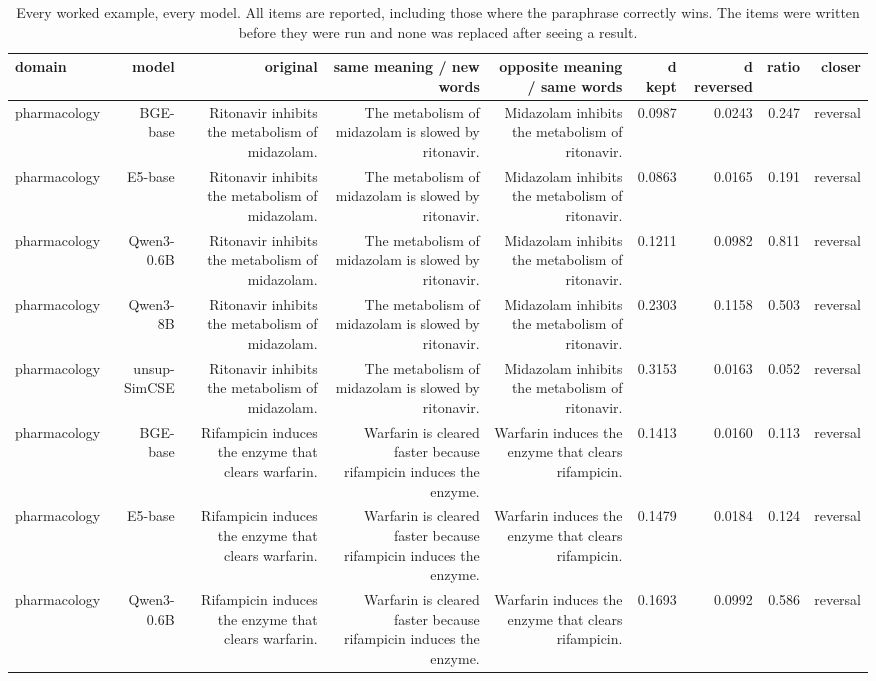 \begin{table}[t]
\centering
\small
\caption{Every worked example, every model. All items are reported, including those where the paraphrase correctly wins. The items were written before they were run and none was replaced after seeing a result.}
\begin{tabular}{lrrrrrrrr}
\toprule
domain & model & original & same meaning / new words & opposite meaning / same words & d kept & d reversed & ratio & closer \\
\midrule
pharmacology & BGE-base & Ritonavir inhibits the metabolism of midazolam. & The metabolism of midazolam is slowed by ritonavir. & Midazolam inhibits the metabolism of ritonavir. & 0.0987 & 0.0243 & 0.247 & reversal \\
pharmacology & E5-base & Ritonavir inhibits the metabolism of midazolam. & The metabolism of midazolam is slowed by ritonavir. & Midazolam inhibits the metabolism of ritonavir. & 0.0863 & 0.0165 & 0.191 & reversal \\
pharmacology & Qwen3-0.6B & Ritonavir inhibits the metabolism of midazolam. & The metabolism of midazolam is slowed by ritonavir. & Midazolam inhibits the metabolism of ritonavir. & 0.1211 & 0.0982 & 0.811 & reversal \\
pharmacology & Qwen3-8B & Ritonavir inhibits the metabolism of midazolam. & The metabolism of midazolam is slowed by ritonavir. & Midazolam inhibits the metabolism of ritonavir. & 0.2303 & 0.1158 & 0.503 & reversal \\
pharmacology & unsup-SimCSE & Ritonavir inhibits the metabolism of midazolam. & The metabolism of midazolam is slowed by ritonavir. & Midazolam inhibits the metabolism of ritonavir. & 0.3153 & 0.0163 & 0.052 & reversal \\
pharmacology & BGE-base & Rifampicin induces the enzyme that clears warfarin. & Warfarin is cleared faster because rifampicin induces the enzyme. & Warfarin induces the enzyme that clears rifampicin. & 0.1413 & 0.0160 & 0.113 & reversal \\
pharmacology & E5-base & Rifampicin induces the enzyme that clears warfarin. & Warfarin is cleared faster because rifampicin induces the enzyme. & Warfarin induces the enzyme that clears rifampicin. & 0.1479 & 0.0184 & 0.124 & reversal \\
pharmacology & Qwen3-0.6B & Rifampicin induces the enzyme that clears warfarin. & Warfarin is cleared faster because rifampicin induces the enzyme. & Warfarin induces the enzyme that clears rifampicin. & 0.1693 & 0.0992 & 0.586 & reversal \\

\end{tabular}
\end{table}
